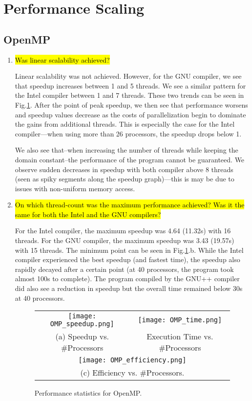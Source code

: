 \documentclass{article}
\begin{document}
\section{Performance Scaling}
\subsection{OpenMP}
\begin{enumerate}
	\item \hl{Was linear scalability achieved?}

	Linear scalability was not achieved. However, for the GNU compiler, we see that speedup increases between 1 and 5 threads. We see a similar pattern for the Intel compiler between 1 and 7 threads. These two trends can be seen in Fig.\ref{fig:omp_performance}. After the point of peak speedup, we then see that performance worsens and speedup values decrease as the costs of parallelization begin to dominate the gains from additional threads. This is especially the case for the Intel compiler---when using more than 26 processors, the speedup drops below 1.

	We also see that--when increasing the number of threads while keeping the domain constant--the performance of the program cannot be guaranteed. We observe sudden decreases in speedup with both compiler above 8 threads (seen as spiky segments along the speedup graph)---this is may be due to issues with non-uniform memory access.
	\vspace{1mm}

	\item \hl{On which thread-count was the maximum performance achieved? Was it the same for both the Intel and the GNU compilers?}

	For the Intel compiler, the maximum speedup was 4.64 (11.32s) with 16 threads. For the GNU compiler, the maximum speedup was 3.43 (19.57s) with 15 threads. The minimum point can be seen in Fig.\ref{fig:omp_performance}.b. While the Intel compiler experienced the best speedup (and fastest time), the speedup also rapidly decayed after a certain point (at 40 processors, the program took almost 100s to complete). The program compiled by the GNU++ compiler did also see a reduction in speedup but the overall time remained below 30s at 40 processors.

	\begin{figure}[p] %
		\hspace*{-0.25\linewidth}\begin{tabular}{cc}
			\texttt{[image: OMP\_speedup.png]} & \texttt{[image: OMP\_time.png]} \\
			(a) Speedup vs. \#Processors & Execution Time vs. \#Processors\\[6pt]
			\multicolumn{2}{c}{\texttt{[image: OMP\_efficiency.png]}}\\
			\multicolumn{2}{c}{(c) Efficiency vs. \#Processors.}
		\end{tabular}
		\caption{Performance statistics for OpenMP.}
		\label{fig:omp_performance}
	\end{figure}

\end{enumerate}
\end{document}
